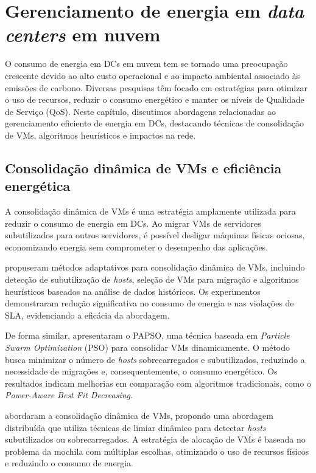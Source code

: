 \documentclass[
	12pt,				%
	oneside,			%
	a4paper,			%
	english,			%
	brazil				%
	]{abntex2ppgsi}
\begin{document}
\section{Gerenciamento de energia em \textit{data centers} em nuvem}

O consumo de energia em DCs em nuvem tem se tornado uma preocupação crescente devido ao alto custo operacional e ao impacto ambiental associado às emissões de carbono. Diversas pesquisas têm focado em estratégias para otimizar o uso de recursos, reduzir o consumo energético e manter os níveis de Qualidade de Serviço (QoS). Neste capítulo, discutimos abordagens relacionadas ao gerenciamento eficiente de energia em DCs, destacando técnicas de consolidação de VMs, algoritmos heurísticos e impactos na rede.

\subsection{Consolidação dinâmica de VMs e eficiência energética}

A consolidação dinâmica de VMs é uma estratégia amplamente utilizada para reduzir o consumo de energia em DCs. Ao migrar VMs de servidores subutilizados para outros servidores, é possível desligar máquinas físicas ociosas, economizando energia sem comprometer o desempenho das aplicações.

 propuseram métodos adaptativos para consolidação dinâmica de VMs, incluindo detecção de subutilização de \textit{hosts}, seleção de VMs para migração e algoritmos heurísticos baseados na análise de dados históricos. Os experimentos demonstraram redução significativa no consumo de energia e nas violações de SLA, evidenciando a eficácia da abordagem.

De forma similar,  apresentaram o PAPSO, uma técnica baseada em \textit{Particle Swarm Optimization} (PSO) para consolidar VMs dinamicamente. O método busca minimizar o número de \textit{hosts} sobrecarregados e subutilizados, reduzindo a necessidade de migrações e, consequentemente, o consumo energético. Os resultados indicam melhorias em comparação com algoritmos tradicionais, como o \textit{Power-Aware Best Fit Decreasing}.

 abordaram a consolidação dinâmica de VMs, propondo uma abordagem distribuída que utiliza técnicas de limiar dinâmico para detectar \textit{hosts} subutilizados ou sobrecarregados. A estratégia de alocação de VMs é baseada no problema da mochila com múltiplas escolhas, otimizando o uso de recursos físicos e reduzindo o consumo de energia.
\end{document}
